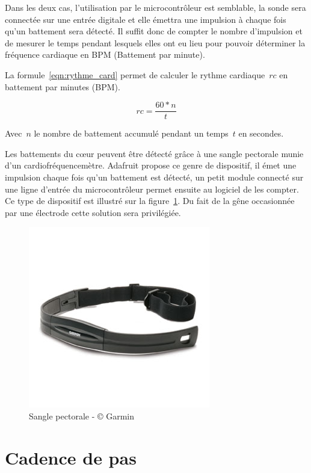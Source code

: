 Dans les deux cas, l’utilisation par le microcontrôleur est semblable, la sonde sera connectée sur une entrée digitale et elle émettra une impulsion à chaque fois qu’un battement sera détecté. Il suffit donc de compter le nombre d’impulsion et de mesurer le temps pendant lesquels elles ont eu lieu pour pouvoir déterminer la fréquence cardiaque en BPM (Battement par minute).

La formule~\ref{eqn:rythme_card} permet de calculer le rythme cardiaque~$rc$ en battement par minutes (BPM).

\begin{equation}\label{eqn:rythme_card}
rc = \frac{60 * n}{t}
\end{equation}

Avec~$n$ le nombre de battement accumulé pendant un temps~$t$ en secondes.

Les battements du cœur peuvent être détecté grâce à une sangle pectorale munie d’un cardiofréquencemètre. Adafruit propose ce genre de dispositif, il émet une impulsion chaque fois qu'un battement est détecté, un petit module connecté sur une ligne d'entrée du microcontrôleur permet ensuite au logiciel de les compter. Ce type de dispositif est illustré sur la figure~\ref{fig:cardiofreq}. Du fait de la gêne occasionnée par une électrode cette solution sera privilégiée.

\begin{figure}[htb]
\centering 
\includegraphics[width=0.6\columnwidth]{../images/garmin-heart-rate.jpg} 
\caption[Sangle Pectorale]{Sangle pectorale - © Garmin}
\label{fig:cardiofreq}
\end{figure}

\section{Cadence de pas}

